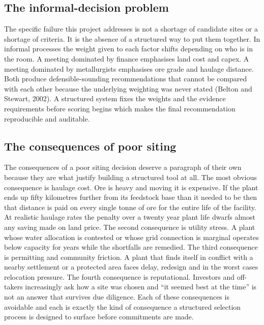 \documentclass[12pt,a4paper]{report}
\begin{document}
\subsection{The informal-decision problem}
The specific failure this project addresses is not a shortage of
candidate sites or a shortage of criteria. It is the absence of a
structured way to put them together. In informal processes the weight
given to each factor shifts depending on who is in the room. A meeting
dominated by finance emphasises land cost and capex. A meeting
dominated by metallurgists emphasises ore grade and haulage distance.
Both produce defensible-sounding recommendations that cannot be
compared with each other because the underlying weighting was never
stated (Belton and Stewart, 2002). A structured system fixes the
weights and the evidence requirements before scoring begins which
makes the final recommendation reproducible and auditable.

\subsection{The consequences of poor siting}
The consequences of a poor siting decision deserve a paragraph of
their own because they are what justify building a structured tool at
all. The most obvious consequence is haulage cost. Ore is heavy and
moving it is expensive. If the plant ends up fifty kilometres further
from its feedstock base than it needed to be then that distance is
paid on every single tonne of ore for the entire life of the facility.
At realistic haulage rates the penalty over a twenty year plant life
dwarfs almost any saving made on land price. The second consequence is
utility stress. A plant whose water allocation is contested or whose
grid connection is marginal operates below capacity for years while
the shortfalls are remedied. The third consequence is permitting and
community friction. A plant that finds itself in conflict with a
nearby settlement or a protected area faces delay, redesign and in the
worst cases relocation pressure. The fourth consequence is
reputational. Investors and off-takers increasingly ask how a site was
chosen and ``it seemed best at the time'' is not an answer that
survives due diligence. Each of these consequences is avoidable and
each is exactly the kind of consequence a structured selection process
is designed to surface before commitments are made.
\end{document}
